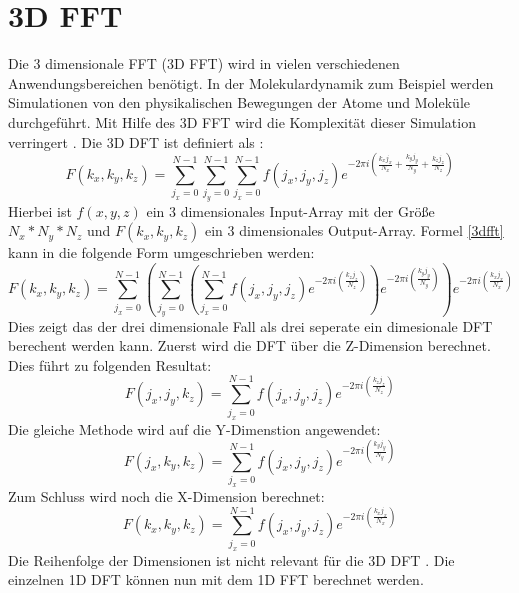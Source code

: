 \section{3D FFT}
Die 3 dimensionale FFT (3D FFT) wird in vielen verschiedenen Anwendungsbereichen benötigt.
In der Molekulardynamik zum Beispiel werden Simulationen von den physikalischen Bewegungen der Atome und Moleküle durchgeführt. Mit Hilfe des 3D FFT wird die Komplexität dieser Simulation verringert \cite[S.1]{shahe 14}.
\newline
Die 3D DFT ist definiert als \cite[S.4]{sig 07}:
\begin{equation}
F(k_x,k_y, k_z)= \sum_{j_x=0}^{N-1} \sum_{j_y=0}^{N-1} \sum_{j_x=0}^{N-1} 
f(j_x,j_y, j_z) e^{-2 \pi i \left( \frac{k_x j_x}{N_x} + \frac{k_y j_y}{N_y} + \frac{k_z j_z}{N_z} \right)}
\label{3dfft}
\end{equation}
Hierbei ist $f(x, y, z)$ ein 3 dimensionales Input-Array mit der Größe $N_x * N_y * N_z$ und $F(k_x,k_y, k_z)$ ein 3 dimensionales Output-Array.
Formel \ref{3dfft} kann in die folgende Form umgeschrieben werden:
\begin{equation}
F(k_x,k_y, k_z)= \sum_{j_x=0}^{N-1} \left( \sum_{j_y=0}^{N-1} \left( \sum_{j_x=0}^{N-1} 
f(j_x,j_y, j_z) e^{-2 \pi i \left( \frac{k_z j_z}{N_z} \right)} \right) e^{-2 \pi i \left( \frac{k_y j_y}{N_y} \right)} \right) e^{-2 \pi i \left( \frac{k_x j_x}{N_x} \right)}
\end{equation}
Dies zeigt das der drei dimensionale Fall als drei seperate ein dimesionale DFT berechent werden kann. Zuerst wird die DFT über die Z-Dimension berechnet. Dies führt zu folgenden Resultat:
\begin{equation}
F(j_x,j_y, k_z)=\sum_{j_x=0}^{N-1} 
f(j_x,j_y, j_z) e^{-2 \pi i \left( \frac{k_z j_z}{N_z} \right)}
\label{eq3dz}
\end{equation}
Die gleiche Methode wird auf die Y-Dimenstion angewendet:
\begin{equation}
F(j_x,k_y, k_z)=\sum_{j_x=0}^{N-1} 
f(j_x,j_y, j_z) e^{-2 \pi i \left( \frac{k_y j_y}{N_y} \right)}
\label{eq3dy}
\end{equation}
Zum Schluss wird noch die X-Dimension berechnet:
\begin{equation}
F(k_x,k_y, k_z)=\sum_{j_x=0}^{N-1} 
f(j_x,j_y, j_z) e^{-2 \pi i \left( \frac{k_x j_x}{N_x} \right)}
\label{eq3dx}
\end{equation}
Die Reihenfolge der Dimensionen ist nicht relevant für die 3D DFT \cite[S.3-4]{sig 07}.
Die einzelnen 1D DFT können nun mit dem 1D FFT berechnet werden.

